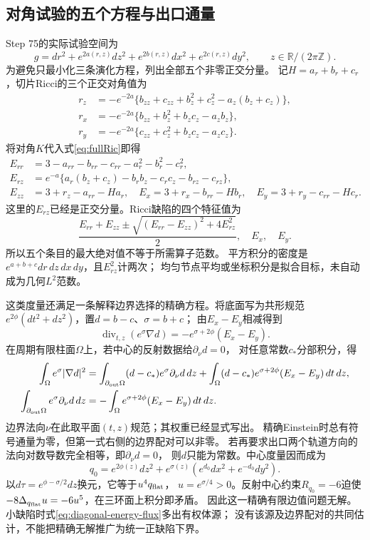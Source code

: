 \documentclass[UTF8,a4paper,11pt,fontset=fandol]{ctexart}
\numberwithin{equation}{section}
\theoremstyle{definition}
\begin{document}
\subsection{对角试验的五个方程与出口通量}\label{sec:diagonal-core}
Step 75的实际试验空间为
\begin{equation}\label{eq:diagonal-core-metric}
 g=dr^2+e^{2a(r,z)}dz^2+e^{2b(r,z)}dx^2+e^{2c(r,z)}dy^2,
 \qquad z\in\mathbb R/(2\pi\mathbb Z).
\end{equation}
为避免只最小化三条演化方程，列出全部五个非零正交分量。
记$H=a_r+b_r+c_r$，切片Ricci的三个正交对角值为
\begin{align*}
 r_z&=-e^{-2a}\{b_{zz}+c_{zz}+b_z^2+c_z^2-a_z(b_z+c_z)\},\\
 r_x&=-e^{-2a}\{b_{zz}+b_z^2+b_zc_z-a_zb_z\},\\
 r_y&=-e^{-2a}\{c_{zz}+c_z^2+b_zc_z-a_zc_z\}.
\end{align*}
将对角$K$代入式\eqref{eq:fullRic}即得
\begin{align}
 E_{rr}&=3-a_{rr}-b_{rr}-c_{rr}-a_r^2-b_r^2-c_r^2,\nonumber\\
 E_{rz}&=e^{-a}\{a_r(b_z+c_z)-b_rb_z-c_rc_z-b_{rz}-c_{rz}\},\nonumber\\
 E_{zz}&=3+r_z-a_{rr}-Ha_r,\quad
 E_x=3+r_x-b_{rr}-Hb_r,\quad
 E_y=3+r_y-c_{rr}-Hc_r.\label{eq:diagonal-five}
\end{align}
这里的$E_{rz}$已经是正交分量。Ricci缺陷的四个特征值为
\[
 \frac{E_{rr}+E_{zz}\pm\sqrt{(E_{rr}-E_{zz})^2+4E_{rz}^2}}2,\quad E_x,\quad E_y.
\]
所以五个条目的最大绝对值不等于所需算子范数。
平方积分的密度是$e^{a+b+c}dr\,dz\,dx\,dy$，且$E_{rz}^2$计两次；
均匀节点平均或坐标积分是拟合目标，未自动成为几何$L^2$范数。

这类度量还满足一条解释边界选择的精确方程。将底面写为共形规范
$e^{2\phi}(dt^2+dz^2)$，置$d=b-c$、$\sigma=b+c$；
由$E_x-E_y$相减得到
\begin{equation}\label{eq:diagonal-forced-flux}
 \operatorname{div}_{t,z}(e^\sigma\nabla d)
 =-e^{\sigma+2\phi}(E_x-E_y).
\end{equation}
在周期有限柱面$\Omega$上，若中心的反射数据给$\partial_\nu d=0$，
对任意常数$c_*$分部积分，得
\begin{align}
 \int_\Omega e^\sigma|\nabla d|^2
 &=\int_{\partial_{\rm out}\Omega}(d-c_*)e^\sigma\partial_\nu d\,dz
   +\int_\Omega(d-c_*)e^{\sigma+2\phi}(E_x-E_y)\,dt\,dz,
   \label{eq:diagonal-energy-flux}\\
 \int_{\partial_{\rm out}\Omega}e^\sigma\partial_\nu d\,dz
 &=-\int_\Omega e^{\sigma+2\phi}(E_x-E_y)\,dt\,dz.\nonumber
\end{align}
边界法向$\nu$在此取平面$(t,z)$规范；其权重已经显式写出。
精确Einstein时总有符号通量为零，但第一式右侧的边界配对可以非零。
若再要求出口两个轨道方向的法向对数导数完全相等，即$\partial_\nu d=0$，
则$d$只能为常数。中心度量因而成为
\[
 q_0=e^{2\phi(z)}dz^2+e^{\sigma(z)}
       (e^{d_0}dx^2+e^{-d_0}dy^2).
\]
以$d\tau=e^{\phi-\sigma/2}dz$换元，它等于$u^4q_{\rm flat}$，
$u=e^{\sigma/4}>0$。反射中心约束$R_{q_0}=-6$迫使
$-8\Delta_{q_{\rm flat}}u=-6u^5$，在三环面上积分即矛盾。
因此这一精确有限边值问题无解。
小缺陷时式\eqref{eq:diagonal-energy-flux}多出有权体源；
没有该源及边界配对的共同估计，不能把精确无解推广为统一正缺陷下界。
\end{document}
